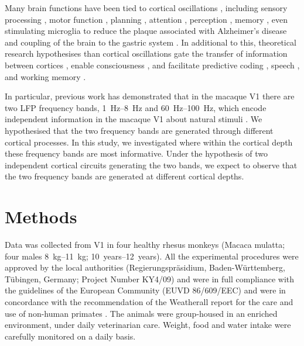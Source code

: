Many brain functions have been tied to cortical oscillations \citep{Buzsaki2004science,Einevoll2013,Colgin2016}, including sensory processing \citep{Henrie2005,Kreiman2006,Mazzoni2011,Szymanski2011}, motor function \citep{Scherberger2005,Rickert2005}, planning \citep{Buzsaki2015}, attention \citep{Fries2001,Jensen2007,Klimesch2012}, perception \citep{Grossberg1991,Fries1997,Gross2007}, memory \citep{Klimesch1999,Raghavachari2001,Pesaran2002,Jensen2002,Jensen2007,Liebe2012}, even stimulating microglia to reduce the plaque associated with Alzheimer's disease \citep{Iaccarino2016} and coupling of the brain to the gastric system \citep{Monto2008,Richter2017}.
In additional to this, theoretical research hypothesises than cortical oscillations gate the transfer of information between cortices \citep{Ahissar2015}, enable consciousness \citep{Llinas1998}, and facilitate predictive coding \citep{Arnal2012}, speech \citep{Giraud2012}, and working memory \citep{Dipoppa2013}.

In particular, previous work has demonstrated that in the macaque \ac{V1} there are two \ac{LFP} frequency bands, \SIrange{1}{8}{Hz} and \SIrange{60}{100}{Hz}, which encode independent information in the macaque \ac{V1} about natural stimuli \citep{Belitski2008}.
We hypothesised that the two frequency bands are generated through different cortical processes.
In this study, we investigated where within the cortical depth these frequency bands are most informative.
Under the hypothesis of two independent cortical circuits generating the two bands, we expect to observe that the two frequency bands are generated at different cortical depths.


\section{Methods}
\label{sec:lam_exp}


Data was collected from \ac{V1} in four healthy rhesus monkeys (Macaca mulatta; four males \SIrange{8}{11}{kg}; \SIrange{10}{12}{years}).
All the experimental procedures were approved by the local authorities (Regierungspr\"asidium, Baden-W\"urttemberg, T\"ubingen, Germany; Project Number KY4/09) and were in full compliance with the guidelines of the European Community (EUVD 86/609/EEC) and were in concordance with the recommendation of the Weatherall report for the care and use of non-human primates \citep{Weatherall2006}.
The animals were group-housed in an enriched environment, under daily veterinarian care.
Weight, food and water intake were carefully monitored on a daily basis.


